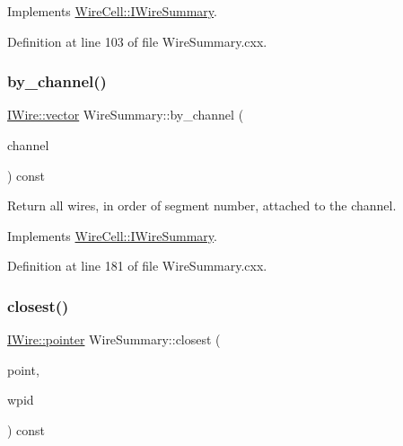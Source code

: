 Implements \hyperlink{class_wire_cell_1_1_i_wire_summary_a58909d3b43592b2633c9d4d9109c90fb}{Wire\+Cell\+::\+I\+Wire\+Summary}.



Definition at line 103 of file Wire\+Summary.\+cxx.

\mbox{\label{class_wire_cell_1_1_wire_summary_ae627ae15980a5d2ea5dd0e3f8eb47fe8}} 
\subsubsection{\texorpdfstring{by\+\_\+channel()}{by\_channel()}}
{\footnotesize\ttfamily \hyperlink{class_wire_cell_1_1_i_data_ae1a9f863380499bb43f39fabb6276660}{I\+Wire\+::vector} Wire\+Summary\+::by\+\_\+channel (\begin{DoxyParamCaption}\item[{int}]{channel }\end{DoxyParamCaption}) const\hspace{0.3cm}{\ttfamily [virtual]}}



Return all wires, in order of segment number, attached to the channel. 



Implements \hyperlink{class_wire_cell_1_1_i_wire_summary_a145ad4b5e1099d7914754459cc3a5a41}{Wire\+Cell\+::\+I\+Wire\+Summary}.



Definition at line 181 of file Wire\+Summary.\+cxx.

\mbox{\label{class_wire_cell_1_1_wire_summary_ad5b6996523e8d8a98fd0caec607fd9ad}} 
\subsubsection{\texorpdfstring{closest()}{closest()}}
{\footnotesize\ttfamily \hyperlink{class_wire_cell_1_1_i_data_aff870b3ae8333cf9265941eef62498bc}{I\+Wire\+::pointer} Wire\+Summary\+::closest (\begin{DoxyParamCaption}\item[{const \hyperlink{namespace_wire_cell_ab2b2565fa6432efbb4513c14c988cda9}{Point} \&}]{point,  }\item[{\hyperlink{class_wire_cell_1_1_wire_plane_id}{Wire\+Plane\+Id}}]{wpid }\end{DoxyParamCaption}) const\hspace{0.3cm}{\ttfamily [virtual]}}

